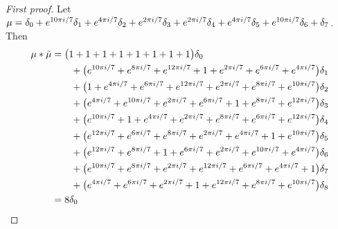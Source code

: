  
\begin{proof}[First proof]
Let  $\mu =  \delta_{0}+e^{10\pi i/7}\delta_{1}+e^{4\pi i/7}\delta_{2}+e^{2\pi i/7}\delta_{3}+e^{2\pi i/7}\delta_{4}+e^{4\pi i/7}\delta_{5}+e^{10\pi i/7}\delta_{6}+\delta_{7}
$.  Then 
\begin{align*} 
\mu * \tilde \mu & = \big(1+1+1+1+1+1+1+1\big)\delta_{0}
\\&\qquad
+\big(e^{10\pi i/7}+e^{8\pi i/7}+e^{12\pi i/7}+1+e^{2\pi i/7}+e^{6\pi i/7}+e^{4\pi i/7}\big)\delta_{1}
\\&\qquad
+\big(1+e^{4\pi i/7}+e^{6\pi i/7}+e^{12\pi i/7}+e^{2\pi i/7}+e^{8\pi i/7}+e^{10\pi i/7}\big)\delta_{2}
\\&\qquad
+\big(e^{4\pi i/7}+e^{10\pi i/7}+e^{2\pi i/7}+e^{6\pi i/7}+1+e^{8\pi i/7}+e^{12\pi i/7}\big)\delta_{3}
\\&\qquad
+\big(e^{10\pi i/7}+1+e^{4\pi i/7}+e^{2\pi i/7}+e^{8\pi i/7}+e^{6\pi i/7}+e^{12\pi i/7}\big)\delta_{4}
\\&\qquad
+\big(e^{12\pi i/7}+e^{6\pi i/7}+e^{8\pi i/7}+e^{2\pi i/7}+e^{4\pi i/7}+1+e^{10\pi i/7}\big)\delta_{5}
\\&\qquad
+\big(e^{12\pi i/7}+e^{8\pi i/7}+1+e^{6\pi i/7}+e^{2\pi i/7}+e^{10\pi i/7}+e^{4\pi i/7}\big)\delta_{6}
\\&\qquad
+\big(e^{10\pi i/7}+e^{8\pi i/7}+e^{2\pi i/7}+e^{12\pi i/7}+e^{6\pi i/7}+e^{4\pi i/7}+1\big)\delta_{7}
\\&\qquad
+\big(e^{4\pi i/7}+e^{6\pi i/7}+e^{2\pi i/7}+1+e^{12\pi i/7}+e^{8\pi i/7}+e^{10\pi i/7}\big)\delta_{8}\\&=8\delta_{0 }\qedhere
\end{align*}
\end{proof}

 

